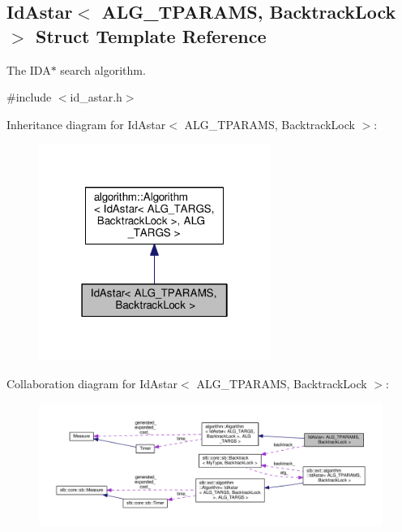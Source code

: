 \hypertarget{structIdAstar}{}\subsection{Id\+Astar$<$ A\+L\+G\+\_\+\+T\+P\+A\+R\+A\+MS, Backtrack\+Lock $>$ Struct Template Reference}
\label{structIdAstar}


The {\ttfamily I\+D\+A$\ast$} search algorithm.  




{\ttfamily \#include $<$id\+\_\+astar.\+h$>$}



Inheritance diagram for Id\+Astar$<$ A\+L\+G\+\_\+\+T\+P\+A\+R\+A\+MS, Backtrack\+Lock $>$\+:
\nopagebreak
\begin{figure}[H]
\begin{center}
\leavevmode
\includegraphics[width=214pt]{structIdAstar__inherit__graph}
\end{center}
\end{figure}


Collaboration diagram for Id\+Astar$<$ A\+L\+G\+\_\+\+T\+P\+A\+R\+A\+MS, Backtrack\+Lock $>$\+:
\nopagebreak
\begin{figure}[H]
\begin{center}
\leavevmode
\includegraphics[width=350pt]{structIdAstar__coll__graph}
\end{center}
\end{figure}
